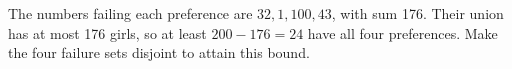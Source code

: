 The numbers failing each preference are $32,1,100,43$, with sum 176. Their union has at most 176 girls, so at least $200-176=\boxed{24}$ have all four preferences. Make the four failure sets disjoint to attain this bound.
